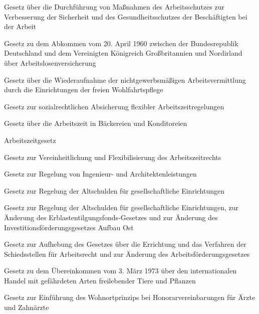 \item[{ArbSchG}] Gesetz über die Durchführung von Maßnahmen des Arbeitsschutzes zur Verbesserung der Sicherheit und des Gesundheitsschutzes der Beschäftigten bei der Arbeit

\item[{ArbVAbkGBRG}] Gesetz zu dem Abkommen vom 20. April 1960 zwischen der Bundesrepublik Deutschland und dem Vereinigten Königreich Großbritannien und Nordirland über Arbeitslosenversicherung

\item[{ArbVermFrWohlfG}] Gesetz über die Wiederaufnahme der nichtgewerbsmäßigen Arbeitsvermittlung durch die Einrichtungen der freien Wohlfahrtspflege

\item[{ArbZAbsichG}] Gesetz zur sozialrechtlichen Absicherung flexibler Arbeitszeitregelungen

\item[{ArbZBäckG}] Gesetz über die Arbeitszeit in Bäckereien und Konditoreien

\item[{ArbZG}] Arbeitszeitgesetz

\item[{ArbZRG}] Gesetz zur Vereinheitlichung und Flexibilisierung des Arbeitszeitrechts

\item[{ArchLG}] Gesetz zur Regelung von Ingenieur- und Architektenleistungen

\item[{ARG}] Gesetz zur Regelung der Altschulden für gesellschaftliche Einrichtungen

\item[{ARGEuaÄndG}] Gesetz zur Regelung der Altschulden für gesellschaftliche Einrichtungen, zur Änderung des Erblastentilgungsfonds-Gesetzes und zur Änderung des Investitionsförderungsgesetzes Aufbau Ost

\item[{ARSchiedsGAufhG}] Gesetz zur Aufhebung des Gesetzes über die Errichtung und das Verfahren der Schiedsstellen für Arbeitsrecht und zur Änderung des Arbeitsförderungsgesetzes

\item[{ArtSchutzÜbkG}] Gesetz zu dem Übereinkommen vom 3. März 1973 über den internationalen Handel mit gefährdeten Arten freilebender Tiere und Pflanzen

\item[{ArztWohnortG}] Gesetz zur Einführung des Wohnortprinzips bei Honorarvereinbarungen für Ärzte und Zahnärzte

